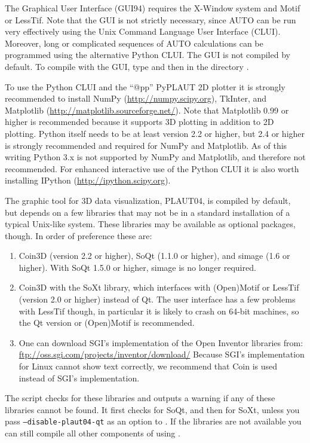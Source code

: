 \documentclass[12pt]{report}
\begin{document}
The Graphical User Interface (GUI94) requires the {\cal X-Window} system
and {\cal Motif} or {\cal LessTif}.
Note that the GUI is not strictly necessary, since {\cal AUTO} can be
run very effectively using the Unix Command Language User Interface (CLUI).
Moreover, long or complicated sequences of {\cal AUTO} calculations can
be programmed using the alternative Python CLUI. 
The GUI is not compiled by default. To compile
\AUTO with the GUI, type 
and then  in the directory .

To use the Python CLUI and the ``@pp'' {\cal PyPLAUT} 2D plotter it
is strongly recommended to install NumPy
(\url{http://numpy.scipy.org}), TkInter, and
Matplotlib (\url{http://matplotlib.sourceforge.net/}).
Note that Matplotlib 0.99 or higher is recommended because it supports
3D plotting in addition to 2D plotting.
Python itself needs to be at least version 2.2 or higher, but 2.4 or
higher is strongly recommended and required for NumPy and Matplotlib.
As of this writing Python 3.x is not supported by NumPy and
Matplotlib, and therefore not recommended.
For enhanced interactive use of the Python CLUI it is also worth
installing IPython (\url{http://ipython.scipy.org}).

The graphic tool for 3D \AUTO data visualization, {\cal PLAUT04}, is
compiled by default, but depends on a few libraries that may not be
in a standard installation of a typical Unix-like
system. These libraries may be available as optional packages,
though. In order of preference these are:
\begin{enumerate}
\item
Coin3D (version 2.2 or higher), SoQt (1.1.0 or higher), and simage
(1.6 or higher). With SoQt 1.5.0 or higher, simage is no longer required.
\item
Coin3D with the SoXt library, which interfaces with (Open)Motif or
LessTif (version 2.0 or higher) instead of Qt. The user interface has
a few problems with LessTif though, in particular it is likely to
crash on 64-bit machines, so the Qt version or (Open)Motif is
recommended.
\item
One can download SGI's implementation of the
Open Inventor libraries from:
\url{ftp://oss.sgi.com/projects/inventor/download/}
Because SGI's implementation for Linux cannot show text correctly, 
we recommend that Coin is used instead of SGI's implementation. 
\end{enumerate}

The  script checks
for these libraries and outputs a warning if any of these libraries
cannot be found. It first checks for SoQt, and then for SoXt, unless
you pass {\tt --disable-plaut04-qt} as an option to .
If the libraries are not available you can still compile
all other components of \AUTO using .
\end{document}
